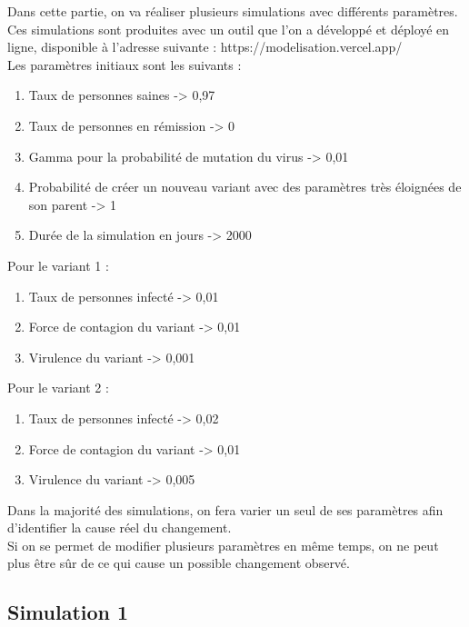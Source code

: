 \documentclass{article}
\begin{document}
Dans cette partie, on va réaliser plusieurs simulations avec différents paramètres. Ces simulations sont produites avec un outil que l'on a développé et déployé en ligne, disponible à l'adresse suivante : https://modelisation.vercel.app/ \\
Les paramètres initiaux sont les suivants : \\
\begin{enumerate}
    \item Taux de personnes saines -> 0,97
    \item Taux de personnes en rémission -> 0
    \item Gamma pour la probabilité de mutation du virus -> 0,01
    \item Probabilité de créer un nouveau variant avec des paramètres très éloignées de son parent -> 1
    \item Durée de la simulation en jours -> 2000\\
\end{enumerate}
Pour le variant 1 : 
\begin{enumerate}
    \item Taux de personnes infecté -> 0,01
    \item Force de contagion du variant -> 0,01
    \item Virulence du variant -> 0,001\\
\end{enumerate}
Pour le variant 2 : 
\begin{enumerate}
    \item Taux de personnes infecté -> 0,02
    \item Force de contagion du variant -> 0,01
    \item Virulence du variant -> 0,005\\
\end{enumerate}

Dans la majorité des simulations, on fera varier un seul de ses paramètres afin d'identifier la cause réel du changement. \\ 
Si on se permet de modifier plusieurs paramètres en même temps, on ne peut plus être sûr de ce qui cause un possible changement observé. \\

\subsection{Simulation 1}
\end{document}
